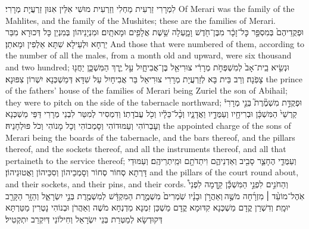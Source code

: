 {לִמְרָרִי זַרְעִית מַחְלִי וְזַרְעִית מוּשִׁי אִלֵּין אִנּוּן זַרְעֲיָת מְרָרִי׃}
{Of Merari was the family of the Mahlites, and the family of the Mushites; these are the families of Merari.}{}
{וּפְקֻדֵיהֶם֙ בְּמִסְפַּ֣ר כׇּל־זָכָ֔ר מִבֶּן־חֹ֖דֶשׁ וָמָ֑עְלָה שֵׁ֥שֶׁת אֲלָפִ֖ים וּמָאתָֽיִם׃}
{וּמִנְיָנֵיהוֹן בְּמִנְיַן כָּל דְּכוּרָא מִבַּר יַרְחָא וּלְעֵילָא שִׁתָּא אַלְפִין וּמָאתַן׃}
{And those that were numbered of them, according to the number of all the males, from a month old and upward, were six thousand and two hundred;}{}
{וּנְשִׂ֤יא בֵֽית־אָב֙ לְמִשְׁפְּחֹ֣ת מְרָרִ֔י צוּרִיאֵ֖ל בֶּן־אֲבִיחָ֑יִל עַ֣ל יֶ֧רֶךְ הַמִּשְׁכָּ֛ן יַחֲנ֖וּ צָפֹֽנָה׃}
{וְרַב בֵּית בָּא לְזַרְעֲיָת מְרָרִי צוּרִיאֵל בַּר אֲבִיחָיִל עַל שִׁדָּא דְּמַשְׁכְּנָא יִשְׁרוֹן צִפּוּנָא׃}
{the prince of the fathers’ house of the families of Merari being Zuriel the son of Abihail; they were to pitch on the side of the tabernacle northward;}{}
{וּפְקֻדַּ֣ת מִשְׁמֶ֘רֶת֮ בְּנֵ֣י מְרָרִי֒ קַרְשֵׁי֙ הַמִּשְׁכָּ֔ן וּבְרִיחָ֖יו וְעַמֻּדָ֣יו וַאֲדָנָ֑יו וְכׇ֨ל־כֵּלָ֔יו וְכֹ֖ל עֲבֹדָתֽוֹ׃}
{וְדִמְסִיר לְמִטַּר לִבְנֵי מְרָרִי דַּפֵּי מַשְׁכְּנָא וְעָבְרוֹהִי וְעַמּוּדוֹהִי וְסָמְכוֹהִי וְכָל מָנוֹהִי וְכֹל פּוּלְחָנֵיהּ׃}
{the appointed charge of the sons of Merari being the boards of the tabernacle, and the bars thereof, and the pillars thereof, and the sockets thereof, and all the instruments thereof, and all that pertaineth to the service thereof;}{}
{וְעַמֻּדֵ֧י הֶחָצֵ֛ר סָבִ֖יב וְאַדְנֵיהֶ֑ם וִיתֵדֹתָ֖ם וּמֵֽיתְרֵיהֶֽם׃}
{וְעַמּוּדֵי דָּרְתָא סְחוֹר סְחוֹר וְסָמְכֵיהוֹן וְסִכֵּיהוֹן וַאֲטוּנֵיהוֹן׃}
{and the pillars of the court round about, and their sockets, and their pins, and their cords.}{}
{וְהַחֹנִ֣ים לִפְנֵ֣י הַמִּשְׁכָּ֡ן קֵ֣דְמָה לִפְנֵי֩ אֹֽהֶל־מוֹעֵ֨ד \small ׀\normalsize  מִזְרָ֜חָה מֹשֶׁ֣ה \legarmeh  וְאַהֲרֹ֣ן וּבָנָ֗יו שֹֽׁמְרִים֙ מִשְׁמֶ֣רֶת הַמִּקְדָּ֔שׁ לְמִשְׁמֶ֖רֶת בְּנֵ֣י יִשְׂרָאֵ֑ל וְהַזָּ֥ר הַקָּרֵ֖ב יוּמָֽת׃
}
{וְדִשְׁרַן קֳדָם מַשְׁכְּנָא קִדּוּמָא קֳדָם מַשְׁכַּן זִמְנָא מַדְנְחָא מֹשֶׁה וְאַהֲרֹן וּבְנוֹהִי נָטְרִין מַטַּרְתָּא דְּקוּדְשָׂא לְמַטְּרַת בְּנֵי יִשְׂרָאֵל וְחִילוֹנַי דְּיִקְרַב יִתְקְטִיל׃}
